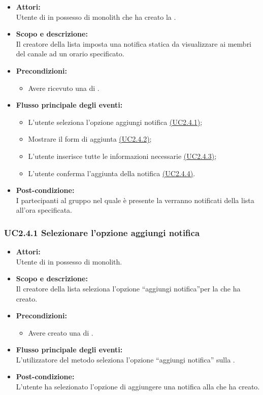 \begin{itemize}
	\item \textbf{Attori:}
	\\Utente di  in possesso di monolith che ha creato la .
	\item \textbf{Scopo e descrizione:} 
	\\Il creatore della lista imposta una notifica statica da visualizzare ai membri del canale ad un orario specificato.
	\item \textbf{Precondizioni:}
	\begin{itemize}
		\item Avere ricevuto una  di .
	\end{itemize}
	\item \textbf{Flusso principale degli eventi:}
	\begin{itemize}
		\item L'utente seleziona l'opzione aggiungi notifica \hyperref[UC2.4.1]{(UC2.4.1)};
		\item Mostrare il form di aggiunta \hyperref[UC2.4.2]{(UC2.4.2)};
		\item L'utente inserisce tutte le informazioni necessarie \hyperref[UC2.4.3]{(UC2.4.3)};
		\item L'utente conferma l'aggiunta della notifica \hyperref[UC2.4.4]{(UC2.4.4)}.
	\end{itemize}
	\item \textbf{Post-condizione:}
	\\I partecipanti al gruppo nel quale è presente la  verranno notificati della lista all'ora specificata.
\end{itemize}

\subsubsection{UC2.4.1 Selezionare l'opzione aggiungi notifica} \label{UC2.4.1}

\begin{itemize}
	\item \textbf{Attori:}
	\\Utente di  in possesso di monolith.
	\item \textbf{Scopo e descrizione:} 
	\\Il creatore della lista seleziona l'opzione “aggiungi notifica”per la  che ha creato.
	\item \textbf{Precondizioni:}
	\begin{itemize}
		\item Avere creato una  di .
	\end{itemize}
	\item \textbf{Flusso principale degli eventi:}
	\\L'utilizzatore del metodo seleziona l'opzione “aggiungi notifica” sulla .
	\item \textbf{Post-condizione:}
	\\L'utente ha selezionato l'opzione di aggiungere una notifica alla  che ha creato.
\end{itemize}

